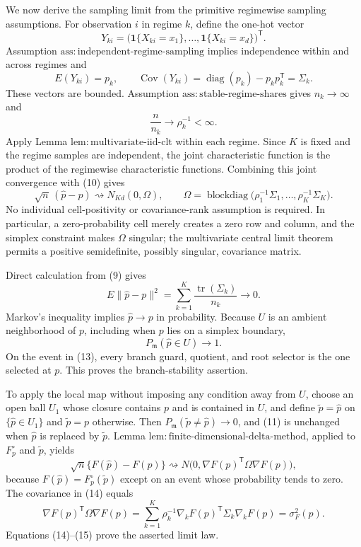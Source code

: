 We now derive the sampling limit from the primitive regimewise sampling assumptions.  For observation \(i\) in regime \(k\), define the one-hot vector
\[
 Y_{ki}=\bigl(\mathbf 1\{X_{ki}=x_1\},\ldots,
                    \mathbf 1\{X_{ki}=x_d\}\bigr)^{\mathsf T}.
\]
Assumption \(\mathrm{ass:independent\text{-}regime\text{-}sampling}\) implies independence within and across regimes and
\[
 E(Y_{ki})=p_k,
 \qquad
 \operatorname{Cov}(Y_{ki})
 =\operatorname{diag}(p_k)-p_kp_k^{\mathsf T}
 =\Sigma_k. \tag{9}
\]
These vectors are bounded.  Assumption \(\mathrm{ass:stable\text{-}regime\text{-}shares}\) gives \(n_k\to\infty\) and
\[
 \frac{n}{n_k}\longrightarrow\rho_k^{-1}<\infty. \tag{10}
\]
Apply Lemma \(\mathrm{lem:multivariate\text{-}iid\text{-}clt}\) within each regime.  Since \(K\) is fixed and the regime samples are independent, the joint characteristic function is the product of the regimewise characteristic functions.  Combining this joint convergence with (10) gives
\[
 \sqrt n\,(\widehat p-p)
 \rightsquigarrow
 N_{Kd}(0,\Omega),
 \qquad
 \Omega=\operatorname{blockdiag}
 \bigl(\rho_1^{-1}\Sigma_1,\ldots,
       \rho_K^{-1}\Sigma_K\bigr). \tag{11}
\]
No individual cell-positivity or covariance-rank assumption is required.  In particular, a zero-probability cell merely creates a zero row and column, and the simplex constraint makes \(\Omega\) singular; the multivariate central limit theorem permits a positive semidefinite, possibly singular, covariance matrix.

Direct calculation from (9) gives
\[
 E\lVert\widehat p-p\rVert^2
 =\sum_{k=1}^{K}\frac{\operatorname{tr}(\Sigma_k)}{n_k}
 \longrightarrow0. \tag{12}
\]
Markov's inequality implies \(\widehat p\to p\) in probability.  Because \(U\) is an ambient neighborhood of \(p\), including when \(p\) lies on a simplex boundary,
\[
 P_{\mathfrak m}(\widehat p\in U)\longrightarrow1. \tag{13}
\]
On the event in (13), every branch guard, quotient, and root selector is the one selected at \(p\).  This proves the branch-stability assertion.

To apply the local map without imposing any condition away from \(U\), choose an open ball \(U_1\) whose closure contains \(p\) and is contained in \(U\), and define \(\widetilde p=\widehat p\) on \(\{\widehat p\in U_1\}\) and \(\widetilde p=p\) otherwise.  Then \(P_{\mathfrak m}(\widetilde p\ne\widehat p)\to0\), and (11) is unchanged when \(\widehat p\) is replaced by \(\widetilde p\).  Lemma \(\mathrm{lem:finite\text{-}dimensional\text{-}delta\text{-}method}\), applied to \(F_p^{\circ}\) and \(\widetilde p\), yields
\[
 \sqrt n\{F(\widehat p)-F(p)\}
 \rightsquigarrow N\bigl(0,\nabla F(p)^{\mathsf T}\Omega\nabla F(p)\bigr), \tag{14}
\]
because \(F(\widehat p)=F_p^{\circ}(\widetilde p)\) except on an event whose probability tends to zero.  The covariance in (14) equals
\[
 \nabla F(p)^{\mathsf T}\Omega\nabla F(p)
 =\sum_{k=1}^{K}\rho_k^{-1}
   \nabla_kF(p)^{\mathsf T}\Sigma_k\nabla_kF(p)
 =\sigma_F^2(p). \tag{15}
\]
Equations (14)--(15) prove the asserted limit law.

